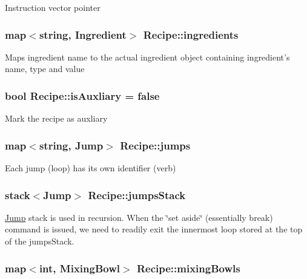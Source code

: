 Instruction vector pointer \hypertarget{classRecipe_a9cf0fa9aedac7925a49a5655401a2680}{
\subsubsection[{ingredients}]{\setlength{\rightskip}{0pt plus 5cm}map$<$string, {\bf Ingredient}$>$ Recipe\-::ingredients\hspace{0.3cm}{\ttfamily [private]}}}\label{classRecipe_a9cf0fa9aedac7925a49a5655401a2680}
Maps ingredient name to the actual ingredient object containing ingredient's name, type and value \hypertarget{classRecipe_a3edfc934ad30f52f01dc90630b0decaa}{
\subsubsection[{is\-Auxliary}]{\setlength{\rightskip}{0pt plus 5cm}bool Recipe\-::is\-Auxliary = false\hspace{0.3cm}{\ttfamily [private]}}}\label{classRecipe_a3edfc934ad30f52f01dc90630b0decaa}
Mark the recipe as auxliary \hypertarget{classRecipe_a0e57db5b119a8dcc06cfd79a0d1857ed}{
\subsubsection[{jumps}]{\setlength{\rightskip}{0pt plus 5cm}map$<$string, {\bf Jump}$>$ Recipe\-::jumps\hspace{0.3cm}{\ttfamily [private]}}}\label{classRecipe_a0e57db5b119a8dcc06cfd79a0d1857ed}
Each jump (loop) has its own identifier (verb) \hypertarget{classRecipe_a66460d610a0717995788284a3d4c4ba5}{
\subsubsection[{jumps\-Stack}]{\setlength{\rightskip}{0pt plus 5cm}stack$<${\bf Jump}$>$ Recipe\-::jumps\-Stack\hspace{0.3cm}{\ttfamily [private]}}}\label{classRecipe_a66460d610a0717995788284a3d4c4ba5}
\hyperlink{structJump}{Jump} stack is used in recursion. When the \char`\"{}set aside\char`\"{} (essentially break) command is issued, we need to readily exit the innermost loop stored at the top of the jumps\-Stack. \hypertarget{classRecipe_ad21a1bda0d75378dd9b53c1abb76524f}{
\subsubsection[{mixing\-Bowls}]{\setlength{\rightskip}{0pt plus 5cm}map$<$int, {\bf Mixing\-Bowl}$>$ Recipe\-::mixing\-Bowls\hspace{0.3cm}{\ttfamily [private]}}}\label{classRecipe_ad21a1bda0d75378dd9b53c1abb76524f}
